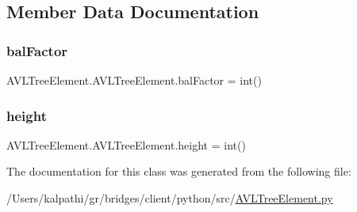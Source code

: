 \subsection{Member Data Documentation}
\hypertarget{class_a_v_l_tree_element_1_1_a_v_l_tree_element_a4fa786c8cd6c10a83b249979e19d2e2a}{}\label{class_a_v_l_tree_element_1_1_a_v_l_tree_element_a4fa786c8cd6c10a83b249979e19d2e2a} 
\subsubsection{\texorpdfstring{bal\+Factor}{balFactor}}
{\footnotesize\ttfamily A\+V\+L\+Tree\+Element.\+A\+V\+L\+Tree\+Element.\+bal\+Factor = int()\hspace{0.3cm}{\ttfamily [static]}}

\hypertarget{class_a_v_l_tree_element_1_1_a_v_l_tree_element_acf75c045d479489e7a3add1b547d2624}{}\label{class_a_v_l_tree_element_1_1_a_v_l_tree_element_acf75c045d479489e7a3add1b547d2624} 
\subsubsection{\texorpdfstring{height}{height}}
{\footnotesize\ttfamily A\+V\+L\+Tree\+Element.\+A\+V\+L\+Tree\+Element.\+height = int()\hspace{0.3cm}{\ttfamily [static]}}



The documentation for this class was generated from the following file\+:\begin{DoxyCompactItemize}
\item 
/\+Users/kalpathi/gr/bridges/client/python/src/\hyperlink{_a_v_l_tree_element_8py}{A\+V\+L\+Tree\+Element.\+py}\end{DoxyCompactItemize}
